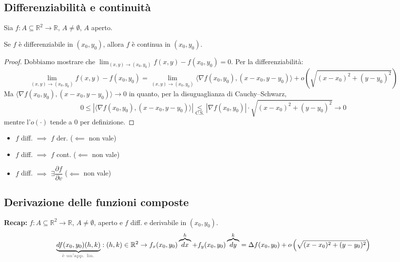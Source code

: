
\subsection{Differenziabilità e continuità}

\begin{theorem}
Sia $f : A \subseteq \mathbb{R}^2 \to \mathbb{R}$, $A \neq \emptyset$, $A$ aperto.

Se $f$ è differenziabile in $(x_0, y_0)$, allora $f$ è continua in $(x_0, y_0)$.
\end{theorem}

\begin{proof}
Dobbiamo mostrare che $\displaystyle\lim_{(x, y) \to (x_0, y_0)} f(x, y) - f(x_0, y_0) = 0$. Per la differenziabilità:
\[
\lim_{(x, y) \to (x_0, y_0)} f(x, y) - f(x_0, y_0) = \lim_{(x, y) \to (x_0, y_0)} \langle \nabla f(x_0, y_0), (x - x_0, y - y_0) \rangle + o\left( \sqrt{(x - x_0)^2 + (y - y_0)^2} \right)
\]
Ma $\langle \nabla f(x_0, y_0), (x - x_0, y - y_0) \rangle \to 0$ in quanto, per la disuguaglianza di Cauchy--Schwarz,
\[
0 \le \left| \langle \nabla f(x_0, y_0), (x - x_0, y - y_0) \rangle \right| \underset{\text{C.S.}}{\le} \left| \nabla f(x_0, y_0) \right| \cdot \sqrt{(x - x_0)^2 + (y - y_0)^2} \to 0
\]
mentre l'$o(\cdot)$ tende a $0$ per definizione.
\end{proof}

\begin{oss}
\begin{itemize}
    \item $f$ diff. $\implies$ $f$ der. \quad ($\impliedby$ non vale)
    \item $f$ diff. $\implies$ $f$ cont. \quad ($\impliedby$ non vale)
    \item $f$ diff. $\implies$ $\exists \dfrac{\partial f}{\partial v}$ \quad {} \quad ($\impliedby$ non vale)
\end{itemize}
\end{oss}

\subsection{Derivazione delle funzioni composte}

\textbf{Recap:} $f : A \subseteq \mathbb{R}^2 \to \mathbb{R}$, $A \neq \emptyset$, aperto e $f$ diff. e derivabile in $(x_0, y_0)$.
\[
\underbrace{df(x_0, y_0)(h, k)}_{\text{\pencilnote{è un'app. lin.}}} : (h, k) \in \mathbb{R}^2 \to f_x(x_0, y_0)\overbrace{dx}^{h} + f_y(x_0, y_0)\overbrace{dy}^{k} = \Delta f(x_0, y_0) + o\left(\sqrt{(x - x_0)^2 + (y - y_0)^2}\right)
\]

